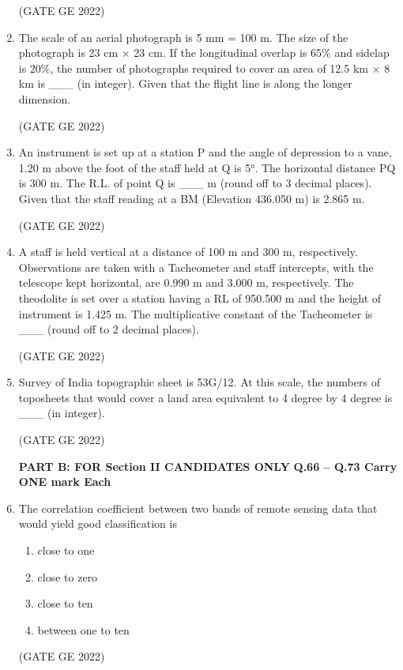 \documentclass[journal,12pt,onecolumn]{IEEEtran}
\theoremstyle{remark}
\begin{document}
\begin{enumerate}
\hfill (GATE GE 2022)

\item The scale of an aerial photograph is 5 mm = 100 m. The size of the photograph is 23 cm × 23 cm. If the longitudinal overlap is 65\% and sidelap is 20\%, the number of photographs required to cover an area of 12.5 km × 8 km is \_\_\_ (in integer). Given that the flight line is along the longer dimension.

\hfill (GATE GE 2022)

\item An instrument is set up at a station P and the angle of depression to a vane, 1.20 m above the foot of the staff held at Q is 5°. The horizontal distance PQ is 300 m. The R.L. of point Q is \_\_\_ m (round off to 3 decimal places). Given that the staff reading at a BM (Elevation 436.050 m) is 2.865 m.

\hfill (GATE GE 2022)

\item A staff is held vertical at a distance of 100 m and 300 m, respectively. Observations are taken with a Tacheometer and staff intercepts, with the telescope kept horizontal, are 0.990 m and 3.000 m, respectively. The theodolite is set over a station having a RL of 950.500 m and the height of instrument is 1.425 m. The multiplicative constant of the Tacheometer is \_\_\_ (round off to 2 decimal places).

\hfill (GATE GE 2022)

\item Survey of India topographic sheet is 53G/12. At this scale, the numbers of toposheets that would cover a land area equivalent to 4 degree by 4 degree is \_\_\_ (in integer).

\hfill (GATE GE 2022)

\textbf{PART B: FOR Section II CANDIDATES ONLY }
\textbf{Q.66 – Q.73 Carry ONE mark Each}

\item The correlation coefficient between two bands of remote sensing data that would yield good classification is
\begin{enumerate}
    \item close to one
    \item close to zero
    \item close to ten
    \item between one to ten
\end{enumerate}

\hfill (GATE GE 2022)


\end{enumerate}
\end{document}
